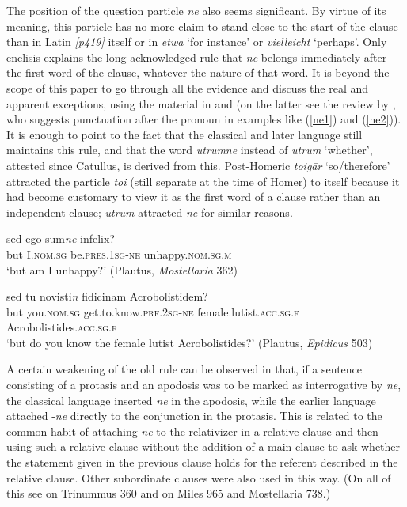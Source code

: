 The position of the question particle \emph{ne} also seems significant. By virtue of its meaning, this particle has no more claim to stand close to the start of the clause than  in Latin \hyperlink{p419}{\emph{[p419]}} itself or in  \emph{etwa} `for instance' or \emph{vielleicht} `perhaps'. Only enclisis explains the long-acknowledged rule that \emph{ne} belongs immediately after the first word of the clause, whatever the nature of that word. It is beyond the scope of this paper to go through all the evidence and discuss the real and apparent exceptions, using the material in \citet[75ff.]{Hand1845} and \citet[42--46]{Kaempf1886} (on the latter see the review by \citealp{Abraham1887}, who suggests punctuation after the pronoun in examples like (\ref{ne1}) and (\ref{ne2})). It is enough to point to the fact that the classical and later language still maintains this rule, and that the word \emph{utrumne}\label{utrumne} instead of \emph{utrum} `whether', attested since Catullus, is derived from this. Post-Homeric  \emph{toigār} `so/therefore' attracted the particle \emph{toi} (still separate at the time of Homer) to itself because it had become customary to view it as the first word of a clause rather than an independent clause; \emph{utrum} attracted \emph{ne} for similar reasons.

\begin{exe}
\ex
\gll sed ego sum\emph{ne} infelix?\\
but I.\textsc{nom.sg} be.\textsc{pres.1sg}-\textsc{ne} unhappy.\textsc{nom.sg.m}\\
\trans `but am I unhappy?' (Plautus, \textit{Mostellaria} 362)
\label{ne1}
\end{exe}

\begin{exe}
\ex
\gll sed tu novisti\emph{n} fidicinam Acrobolistidem?\\
but you.\textsc{nom.sg} get.to.know.\textsc{prf.2sg}-\textsc{ne} female.lutist.\textsc{acc.sg.f} Acrobolistides.\textsc{acc.sg.f}\\
\trans `but do you know the female lutist Acrobolistides?' (Plautus, \textit{Epidicus} 503)
\label{ne2}
\end{exe}

A certain weakening of the old rule can be observed in that, if a sentence consisting of a protasis and an apodosis was to be marked as interrogative by \emph{ne}, the classical language inserted \emph{ne} in the apodosis, while the earlier language attached -\emph{ne} directly to the conjunction in the protasis. This is related to the common habit of attaching \emph{ne} to the relativizer in a relative clause and then using such a relative clause without the addition of a main clause to ask whether the statement given in the previous clause holds for the referent described in the relative clause. Other subordinate clauses were also used in this way. (On all of this see \citealp{BrixNiemeyer1888} on Trinummus 360 and \citealp{Lorenz1883,Lorenz1886} on Miles 965 and Mostellaria 738.)

